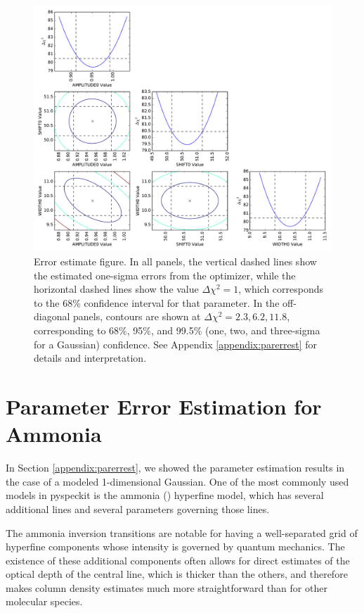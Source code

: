 \documentclass[twocolumn]{aastex62}
\begin{document}
\begin{figure}[!htp]
\includegraphics[scale=1,width=7in]{error_estimate_demonstration.pdf}
\caption{Error estimate figure.
In all panels, the vertical
dashed lines show the estimated one-sigma errors from the optimizer, while the
horizontal dashed lines show the value $\Delta\chi^2=1$, which corresponds to
the 68\% confidence interval for that parameter.
In the off-diagonal panels, contours are shown at $\Delta\chi^2=2.3,6.2,11.8$,
corresponding to 68\%, 95\%, and 99.5\% (one, two, and three-sigma for a
Gaussian) confidence.
See Appendix \ref{appendix:parerrest} for details and interpretation.}
\label{fig:parerrestdemo}
\end{figure}


\section{Parameter Error Estimation for Ammonia}
\label{appendix:parerrestammonia}
In Section \ref{appendix:parerrest}, we showed the parameter estimation results
in the case of a modeled 1-dimensional Gaussian.  One of the most commonly used
models in pyspeckit is the ammonia (\ammonia) hyperfine model, which has several
additional lines and several parameters governing those lines.

The ammonia inversion transitions are notable for having a well-separated grid
of hyperfine components whose intensity is governed by quantum mechanics.
The existence of these additional components often allows for direct estimates
of the optical depth of the central line, which is thicker than the others,
and therefore makes column density estimates much more straightforward than
for other molecular species.
\end{document}
